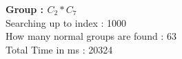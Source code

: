 \textbf{Group : $C_2*C_7$}\\
Searching up to index : 1000\\
How many normal groups are found : 63\\
Total Time in ms : 20324\\
